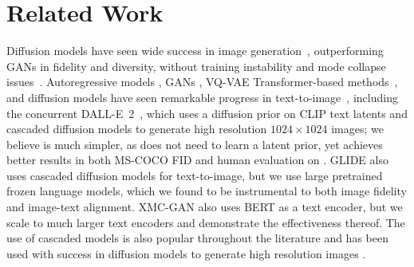 \vspace{\presectionspace}
\section{Related Work}
\vspace{\postsectionspace}
Diffusion models have seen wide success in image generation~\cite{ho2020denoising,nichol2021improved,saharia2021image,dhariwal2021diffusion,ho2021cascaded,sahariac-palette}, outperforming GANs in fidelity and diversity, without training instability and mode collapse issues~\cite{brock2018large,dhariwal2021diffusion,ho2021cascaded}.
Autoregressive models \cite{mansimov-iclr-2016}, GANs \cite{xu-cvpr-2018,zhang2021cross}, VQ-VAE Transformer-based methods~\cite{ramesh-dalle,gafni2022make}, and diffusion models have seen remarkable progress in text-to-image~\cite{rombach-cvpr-2022,nichol-glide,rombach-cvpr-2022}, including the concurrent \mbox{DALL-E 2}~\cite{ramesh-dalle2}, which uses a diffusion prior on CLIP text latents and cascaded diffusion models to generate high resolution $1024\times1024$ images; we believe \name is much simpler, as \name does not need to learn a latent prior, yet achieves better results in both MS-COCO FID and human evaluation on \benchmarkname.
GLIDE \cite{nichol-glide} also uses cascaded diffusion models for text-to-image, but we use large pretrained frozen language models, which we found to be instrumental to both image fidelity and image-text alignment.
XMC-GAN \cite{zhang2021cross} also uses BERT as a text encoder, but we scale to much larger text encoders and demonstrate the effectiveness thereof.
The use of cascaded models is also popular throughout the literature \cite{denton-nips-2015,menick-iclr-2019} and has been used with success in diffusion models to generate high resolution images \cite{dhariwal2021diffusion,ho2021cascaded}. %

